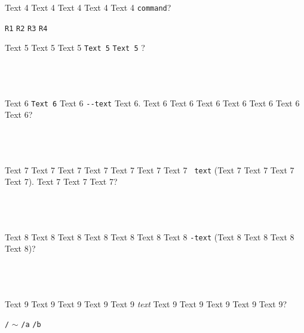 \documentclass[9pt]{exam}
\begin{document}
\begin{questions}
\question
    Text 4 Text 4 Text 4 Text 4 Text 4 \texttt{command}?\\
    \begin{oneparchoices}
     \choice \texttt{R1}
     \choice \texttt{R2}
     \choice \texttt{R3}
     \choice \texttt{R4}
    \end{oneparchoices}

\question
    Text 5 Text 5 Text 5 \textquotedbl{}\texttt{Text 5}\textquotedbl{} 
    \textquotedbl{}\texttt{Text 5}\textquotedbl{} ?\\\\
    \makebox[0.9\textwidth]{\$ \enspace\hrulefill}\\\\
    \makebox[0.9\textwidth]{\enspace\hrulefill}

\question
    Text 6 \texttt{Text 6} Text 6 \texttt{-{}-text} Text 6.
    Text 6 Text 6 Text 6 Text 6 Text 6 Text 6 Text 6?\\\\
    \makebox[0.9\textwidth]{\$ \enspace\hrulefill}\\\\
    \makebox[0.9\textwidth]{\enspace\hrulefill}

\question
    Text 7 Text 7 Text 7 Text 7 Text 7 Text 7 Text 7
    \texttt{\textquotesingle{} text\textquotesingle{}}
    (Text 7 Text 7 Text 7 Text 7). Text 7 Text 7 Text 7?\\\\
    \makebox[0.9\textwidth]{\$ \enspace\hrulefill}\\\\
    \makebox[0.9\textwidth]{\enspace\hrulefill}

\question
    Text 8 Text 8 Text 8 Text 8 Text 8 Text 8 Text 8
    \texttt{\textquotesingle{}-text\textquotesingle{}}
    (Text 8 Text 8 Text 8 Text 8)?\\\\
    \makebox[0.9\textwidth]{\$ \enspace\hrulefill}\\\\
    \makebox[0.9\textwidth]{\enspace\hrulefill}

\question
    Text 9 Text 9 Text 9 Text 9 Text 9 \emph{text}
    Text 9 Text 9 Text 9 Text 9 Text 9?\\
    \begin{oneparchoices}
     \choice \texttt{/}
     \choice \texttt{$\sim$}
     \choice \texttt{/a}
     \choice \texttt{/b}
    \end{oneparchoices}


\end{questions}
\end{document}

